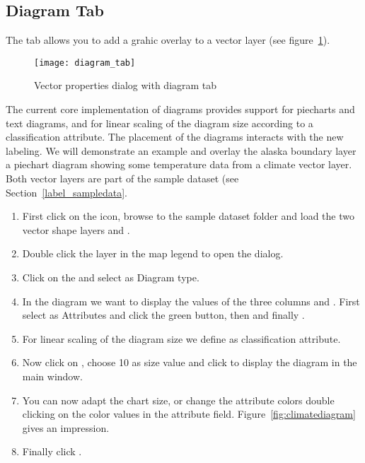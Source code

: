 \subsection{Diagram Tab}\label{sec:diagram}

The  tab allows you to add a grahic overlay to a vector layer (see
figure~\ref{fig:diagramtab}).

\begin{figure}[ht]
   \centering
   \texttt{[image: diagram\_tab]}
   \caption{Vector properties dialog with diagram tab \nixcaption}
   \label{fig:diagramtab}
\end{figure}

The current core implementation of diagrams provides support for piecharts and 
text diagrams, and for linear scaling of the diagram size according to a 
classification attribute. The placement of the diagrams interacts with the 
new labeling. We will demonstrate an example and overlay the alaska 
boundary layer a piechart diagram showing some temperature data from a climate 
vector layer. Both vector layers are part of the \qg sample dataset (see
Section~\ref{label_sampledata}.

\begin{enumerate}
\item First click on the  icon,
browse to the \qg sample dataset folder and load the two vector shape layers
 and .
\item Double click the  layer in the map legend to open the
 dialog.
\item Click on the  and select  as
Diagram type.
\item In the diagram we want to display the values of the three columns
 and . First select
 as Attributes and click the green \button{+} button, then
 and finally .
\item For linear scaling of the diagram size we define 
as classification attribute.
\item Now click on , choose 10 as size value and 
click  to display the diagram in the \qg main window.
\item You can now adapt the chart size, or change the attribute colors double
clicking on the color values in the attribute field.
Figure~\ref{fig:climatediagram} gives an impression.
\item Finally click .
\end{enumerate}

